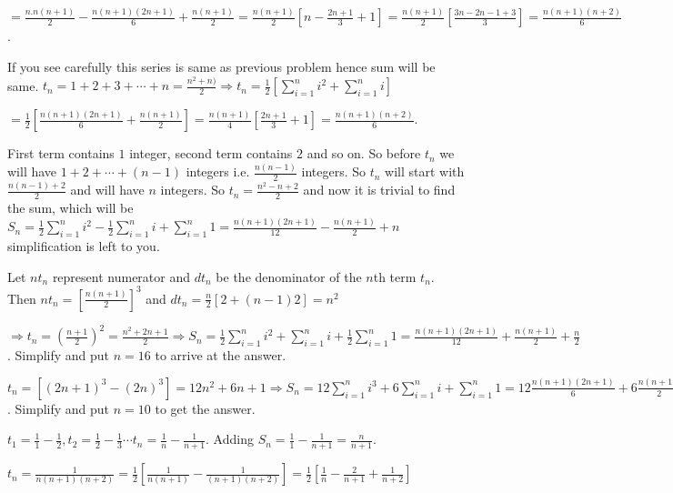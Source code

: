   $= \frac{n.n(n + 1)}{2} - \frac{n(n + 1)(2n + 1)}{6} + \frac{n(n + 1)}{2} = \frac{n(n + 1)}{2}\left[n -
    \frac{2n + 1}{3} + 1\right] = \frac{n(n + 1)}{2}\left[\frac{3n - 2n - 1 + 3}{3}\right] = \frac{n(n +
    1)(n + 2)}{6}$.
\item   If you see carefully this series is same as previous problem hence sum will be same.
  $t_n = 1 + 2 + 3 + \cdots + n = \frac{n^2 + n)}{2}\Rightarrow \displaystyle t_n =
  \frac{1}{2}\left[\sum_{i=1}^ni^2 + \sum_{i=1}^ni\right]$

  $=\frac{1}{2}\left[\frac{n(n + 1)(2n + 1)}{6} + \frac{n(n + 1)}{2}\right] = \frac{n(n +
    1)}{4}\left[\frac{2n + 1}{3} + 1\right] = \frac{n(n + 1)(n + 2)}{6}$.
\item First term contains $1$ integer, second term contains $2$ and so on. So before $t_n$ we will have $1 +
  2 + \cdots + (n - 1)$ integers i.e. $\frac{n(n - 1)}{2}$ integers. So $t_n$ will start with $\frac{n(n -
    1) + 2}{2}$ and will have $n$ integers. So $t_n = \frac{n^2 - n + 2}{2} $ and now it is trivial to find
  the sum, which will be $\displaystyle S_n = \frac{1}{2}\sum_{i=1}^ni^2 -
  \frac{1}{2}\sum_{i=1}^ni + \sum_{i=1}^n1 = \frac{n(n + 1)(2n + 1)}{12} - \frac{n(n + 1)}{2} + n$
  simplification is left to you.
\item Let $nt_n$ represent numerator and $dt_n$ be the denominator of the $n$th term $t_n$. Then $nt_n =
  \left[\frac{n(n + 1)}{2}\right]^3$ and $dt_n = \frac{n}{2}[2 + (n - 1)2] = n^2$

  $\displaystyle\Rightarrow t_n = \left(\frac{n + 1}{2}\right)^2 = \frac{n^2 + 2n + 1}{2}\Rightarrow S_n =
  \frac{1}{2}\sum_{i=1}^ni^2 + \sum_{i=1}^ni + \frac{1}{2}\sum_{i=1}^n1 = \frac{n(n + 1)(2n + 1)}{12} +
  \frac{n(n + 1)}{2} + \frac{n}{2}$. Simplify and put $n=16$ to arrive at the answer.
\item $t_n = [(2n + 1)^3 - (2n)^3] = 12n^2 + 6n + 1\Rightarrow\displaystyle S_n = 12\sum_{i=1}^ni^3 +
  6\sum_{i=1}^n i + \sum_{i=1}^n1 = 12\frac{n(n + 1)(2n + 1)}{6} + 6\frac{n(n + 1)}{2} + n = 2n(n + 1)(2n +
  1) + 3n(n + 1) + n$. Simplify and put $n=10$ to get the answer.
\item $t_1 = \frac{1}{1} - \frac{1}{2}, t_2 = \frac{1}{2} - \frac{1}{3} \cdots t_n = \frac{1}{n} -
  \frac{1}{n + 1}$. Adding $S_n = \frac{1}{1} - \frac{1}{n + 1} = \frac{n}{n + 1}$.
\item $t_n = \frac{1}{n(n + 1)(n + 2)} = \frac{1}{2}\left[\frac{1}{n(n + 1)} - \frac{1}{(n + 1)(n +
    2)}\right] = \frac{1}{2}\left[\frac{1}{n} - \frac{2}{n + 1} + \frac{1}{n + 2}\right]$

